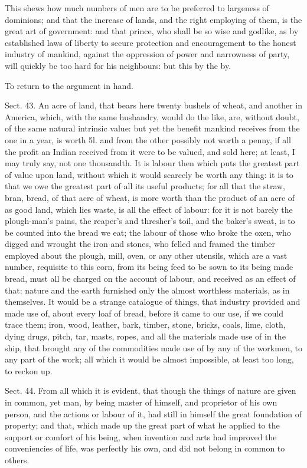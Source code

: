 \documentclass[11pt,openany]{book}
\begin{document}
This shews how much numbers of men are to be preferred to largeness of dominions; and that the increase of lands, and the right employing of them, is the great art of government: and that prince, who shall be so wise and godlike, as by established laws of liberty to secure protection and encouragement to the honest industry of mankind, against the oppression of power and narrowness of party, will quickly be too hard for his neighbours: but this by the by.

To return to the argument in hand.

Sect. 43. An acre of land, that bears here twenty bushels of wheat, and another in America, which, with the same husbandry, would do the like, are, without doubt, of the same natural intrinsic value: but yet the benefit mankind receives from the one in a year, is worth 5l. and from the other possibly not worth a penny, if all the profit an Indian received from it were to be valued, and sold here; at least, I may truly say, not one thousandth. It is labour then which puts the greatest part of value upon land, without which it would scarcely be worth any thing: it is to that we owe the greatest part of all its useful products; for all that the straw, bran, bread, of that acre of wheat, is more worth than the product of an acre of as good land, which lies waste, is all the effect of labour: for it is not barely the plough-man's pains, the reaper's and thresher's toil, and the baker's sweat, is to be counted into the bread we eat; the labour of those who broke the oxen, who digged and wrought the iron and stones, who felled and framed the timber employed about the plough, mill, oven, or any other utensils, which are a vast number, requisite to this corn, from its being feed to be sown to its being made bread, must all be charged on the account of labour, and received as an effect of that: nature and the earth furnished only the almost worthless materials, as in themselves. It would be a strange catalogue of things, that industry provided and made use of, about every loaf of bread, before it came to our use, if we could trace them; iron, wood, leather, bark, timber, stone, bricks, coals, lime, cloth, dying drugs, pitch, tar, masts, ropes, and all the materials made use of in the ship, that brought any of the commodities made use of by any of the workmen, to any part of the work; all which it would be almost impossible, at least too long, to reckon up.

Sect. 44. From all which it is evident, that though the things of nature are given in common, yet man, by being master of himself, and proprietor of his own person, and the actions or labour of it, had still in himself the great foundation of property; and that, which made up the great part of what he applied to the support or comfort of his being, when invention and arts had improved the conveniencies of life, was perfectly his own, and did not belong in common to others.
\end{document}
